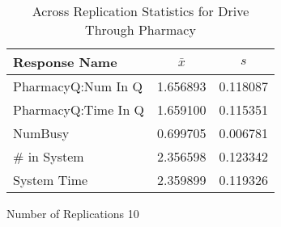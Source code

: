 \documentclass[11pt]{article}
\begin{document}
 
\begin{table}[ht] 
\caption{Across Replication Statistics for Drive Through Pharmacy} 
\centering 
\begin{tabular}{lcc} 
\hline 
Response Name & $ \bar{x} $ & $ s $ \\ 
\hline 
PharmacyQ:Num In Q &     1.656893 &     0.118087 \\ 
PharmacyQ:Time In Q &     1.659100 &     0.115351 \\ 
NumBusy &     0.699705 &     0.006781 \\ 
# in System &     2.356598 &     0.123342 \\ 
System Time &     2.359899 &     0.119326 \\ 
\hline 
\end{tabular} 

 Number of Replications 10 
\end{table} 
\end{document}
